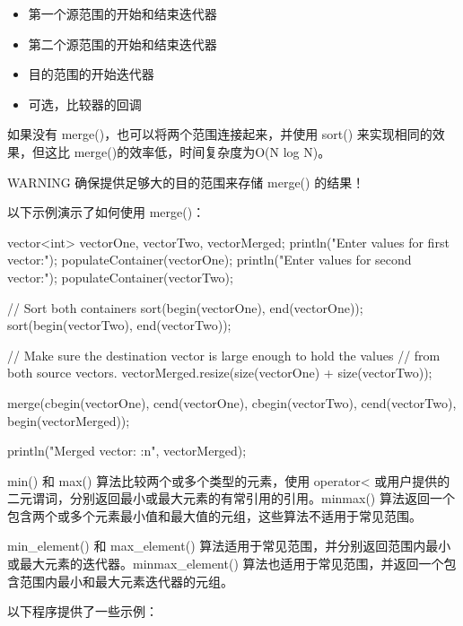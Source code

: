 \begin{itemize}
\item
第一个源范围的开始和结束迭代器

\item
第二个源范围的开始和结束迭代器

\item
目的范围的开始迭代器

\item
可选，比较器的回调
\end{itemize}

如果没有 merge()，也可以将两个范围连接起来，并使用 sort() 来实现相同的效果，但这比 merge()的效率低，时间复杂度为O(N log N)。

\begin{myWarning}{WARNING}
确保提供足够大的目的范围来存储 merge() 的结果！
\end{myWarning}

以下示例演示了如何使用 merge()：

\begin{cpp}
vector<int> vectorOne, vectorTwo, vectorMerged;
println("Enter values for first vector:");
populateContainer(vectorOne);
println("Enter values for second vector:");
populateContainer(vectorTwo);

// Sort both containers
sort(begin(vectorOne), end(vectorOne));
sort(begin(vectorTwo), end(vectorTwo));

// Make sure the destination vector is large enough to hold the values
// from both source vectors.
vectorMerged.resize(size(vectorOne) + size(vectorTwo));

merge(cbegin(vectorOne), cend(vectorOne),
      cbegin(vectorTwo), cend(vectorTwo), begin(vectorMerged));

println("Merged vector: {:n}", vectorMerged);
\end{cpp}


min() 和 max() 算法比较两个或多个类型的元素，使用 operator< 或用户提供的二元谓词，分别返回最小或最大元素的有常引用的引用。minmax() 算法返回一个包含两个或多个元素最小值和最大值的元组，这些算法不适用于常见范围。

min\_element() 和 max\_element() 算法适用于常见范围，并分别返回范围内最小或最大元素的迭代器。minmax\_element() 算法也适用于常见范围，并返回一个包含范围内最小和最大元素迭代器的元组。

以下程序提供了一些示例：

